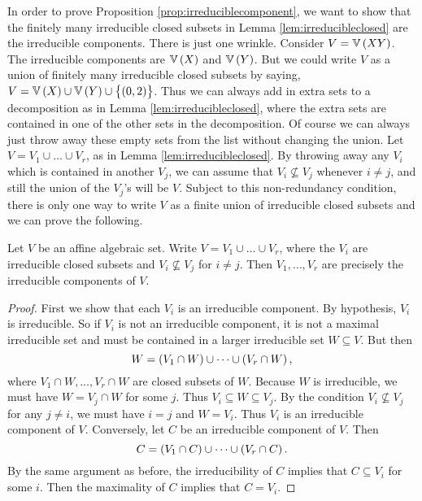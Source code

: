 In order to prove Proposition \ref{prop:irreduciblecomponent}, we want to show that the finitely many irreducible closed subsets in Lemma \ref{lem:irreducibleclosed} are the irreducible components. There is just one wrinkle. Consider $ V = \VV\br{XY} $. The irreducible components are $ \VV\br{X} $ and $ \VV\br{Y} $. But we could write $ V $ as a union of finitely many irreducible closed subsets by saying, $ V = \VV\br{X} \cup \VV\br{Y} \cup \cbr{\br{0, 2}} $. Thus we can always add in extra sets to a decomposition as in Lemma \ref{lem:irreducibleclosed}, where the extra sets are contained in one of the other sets in the decomposition. Of course we can always just throw away these empty sets from the list without changing the union. Let $ V = V_1 \cup \dots \cup V_r $, as in Lemma \ref{lem:irreducibleclosed}. By throwing away any $ V_i $ which is contained in another $ V_j $, we can assume that $ V_i \not\subseteq V_j $ whenever $ i \ne j $, and still the union of the $ V_j $'s will be $ V $. Subject to this non-redundancy condition, there is only one way to write $ V $ as a finite union of irreducible closed subsets and we can prove the following.

\begin{proposition}
\label{prop:irreducibleclosed}
Let $ V $ be an affine algebraic set. Write $ V = V_1 \cup \dots \cup V_r $, where the $ V_i $ are irreducible closed subsets and $ V_i \not\subseteq V_j $ for $ i \ne j $. Then $ V_1, \dots, V_r $ are precisely the irreducible components of $ V $.
\end{proposition}

\begin{proof}
First we show that each $ V_i $ is an irreducible component. By hypothesis, $ V_i $ is irreducible. So if $ V_i $ is not an irreducible component, it is not a maximal irreducible set and must be contained in a larger irreducible set $ W \subseteq V $. But then
$$ W = \br{V_1 \cap W} \cup \dots \cup \br{V_r \cap W}, $$
where $ V_1 \cap W, \dots, V_r \cap W $ are closed subsets of $ W $. Because $ W $ is irreducible, we must have $ W = V_j \cap W $ for some $ j $. Thus $ V_i \subseteq W \subseteq V_j $. By the condition $ V_i \not\subseteq V_j $ for any $ j \ne i $, we must have $ i = j $ and $ W = V_i $. Thus $ V_i $ is an irreducible component of $ V $. Conversely, let $ C $ be an irreducible component of $ V $. Then
$$ C = \br{V_1 \cap C} \cup \dots \cup \br{V_r \cap C}. $$
By the same argument as before, the irreducibility of $ C $ implies that $ C \subseteq V_i $ for some $ i $. Then the maximality of $ C $ implies that $ C = V_i $.
\end{proof}


